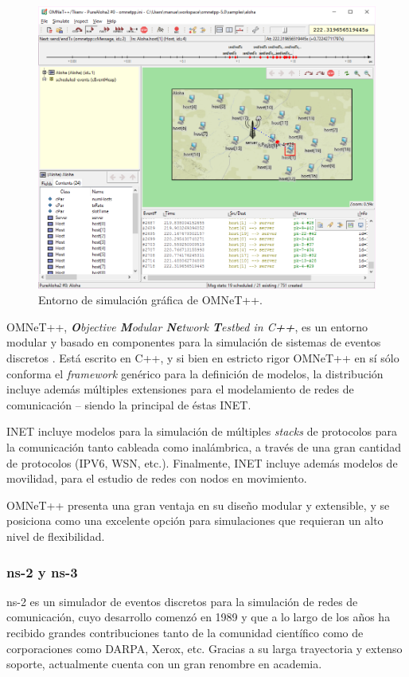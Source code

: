 \begin{figure}
    \centering
    \includegraphics[width=.8\linewidth]{figuras/omnetpp_aloha}
    \caption{Entorno de simulación gráfica de OMNeT++.}
    \label{fig:omnetpp_simgui}
\end{figure}

OMNeT++, \emph{\textbf{O}bjective \textbf{M}odular \textbf{Ne}twork \textbf{T}estbed in C\textbf{++}}, es un entorno modular y basado en componentes para la simulación de sistemas de eventos discretos \cite{omnet2008overview}. Está escrito en C++, y si bien en estricto rigor OMNeT++ en sí sólo conforma el \emph{framework} genérico para la definición de modelos, la distribución incluye además múltiples extensiones para el modelamiento de redes de comunicación -- siendo la principal de éstas INET.

INET incluye modelos para la simulación de múltiples \emph{stacks} de protocolos para la comunicación tanto cableada como inalámbrica, a través de una gran cantidad de protocolos (IPV6, WSN, etc.). Finalmente, INET incluye además modelos de movilidad, para el estudio de redes con nodos en movimiento.

OMNeT++ presenta una gran ventaja en su diseño modular y extensible, y se posiciona como una excelente opción para simulaciones que requieran un alto nivel de flexibilidad.

\subsubsection{ns-2 y ns-3}

ns-2 es un simulador de eventos discretos para la simulación de redes de comunicación, cuyo desarrollo comenzó en 1989 y que a lo largo de los años ha recibido grandes contribuciones tanto de la comunidad científico como de corporaciones como DARPA, Xerox, etc. Gracias a su larga trayectoria y extenso soporte, actualmente cuenta con un gran renombre en academia.

